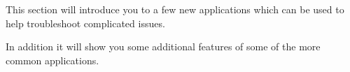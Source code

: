 This section will introduce you to a few new applications which can be used to help troubleshoot complicated issues.

In addition it will show you some additional features of some of the more common applications.